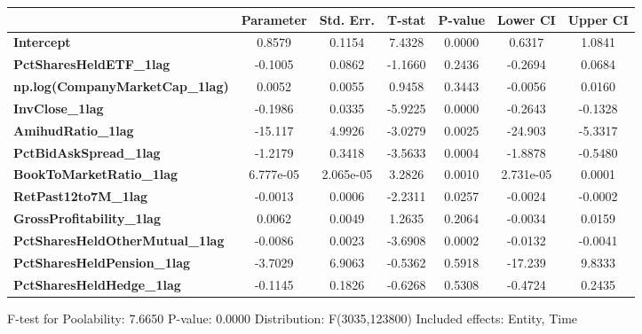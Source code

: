 \begin{center}
\begin{tabular}{lclc}
\bottomrule
\end{tabular}
\begin{tabular}{lcccccc}
                                        & \textbf{Parameter} & \textbf{Std. Err.} & \textbf{T-stat} & \textbf{P-value} & \textbf{Lower CI} & \textbf{Upper CI}  \\
\midrule
\textbf{Intercept}                      &       0.8579       &       0.1154       &      7.4328     &      0.0000      &       0.6317      &       1.0841       \\
\textbf{PctSharesHeldETF\_1lag}         &      -0.1005       &       0.0862       &     -1.1660     &      0.2436      &      -0.2694      &       0.0684       \\
\textbf{np.log(CompanyMarketCap\_1lag)} &       0.0052       &       0.0055       &      0.9458     &      0.3443      &      -0.0056      &       0.0160       \\
\textbf{InvClose\_1lag}                 &      -0.1986       &       0.0335       &     -5.9225     &      0.0000      &      -0.2643      &      -0.1328       \\
\textbf{AmihudRatio\_1lag}              &      -15.117       &       4.9926       &     -3.0279     &      0.0025      &      -24.903      &      -5.3317       \\
\textbf{PctBidAskSpread\_1lag}          &      -1.2179       &       0.3418       &     -3.5633     &      0.0004      &      -1.8878      &      -0.5480       \\
\textbf{BookToMarketRatio\_1lag}        &     6.777e-05      &     2.065e-05      &      3.2826     &      0.0010      &     2.731e-05     &       0.0001       \\
\textbf{RetPast12to7M\_1lag}            &      -0.0013       &       0.0006       &     -2.2311     &      0.0257      &      -0.0024      &      -0.0002       \\
\textbf{GrossProfitability\_1lag}       &       0.0062       &       0.0049       &      1.2635     &      0.2064      &      -0.0034      &       0.0159       \\
\textbf{PctSharesHeldOtherMutual\_1lag} &      -0.0086       &       0.0023       &     -3.6908     &      0.0002      &      -0.0132      &      -0.0041       \\
\textbf{PctSharesHeldPension\_1lag}     &      -3.7029       &       6.9063       &     -0.5362     &      0.5918      &      -17.239      &       9.8333       \\
\textbf{PctSharesHeldHedge\_1lag}       &      -0.1145       &       0.1826       &     -0.6268     &      0.5308      &      -0.4724      &       0.2435       \\
\bottomrule
\end{tabular}
\end{center}

F-test for Poolability: 7.6650 \newline
 P-value: 0.0000 \newline
 Distribution: F(3035,123800) \newline
  \newline
 Included effects: Entity, Time